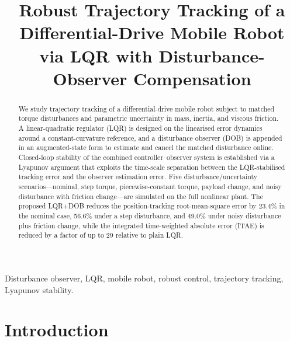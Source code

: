 \documentclass[conference]{IEEEtran}
\begin{document}
\title{Robust Trajectory Tracking of a Differential-Drive Mobile Robot via
LQR with Disturbance-Observer Compensation}

\author{%
\and
{}
\and
{}
}

\maketitle

\begin{abstract}
We study trajectory tracking of a differential-drive mobile robot subject to
matched torque disturbances and parametric uncertainty in mass, inertia, and
viscous friction. A linear-quadratic regulator (LQR) is designed on the
linearised error dynamics around a constant-curvature reference, and a
disturbance observer (DOB) is appended in an augmented-state form to estimate
and cancel the matched disturbance online. Closed-loop stability of the
combined controller--observer system is established via a Lyapunov argument
that exploits the time-scale separation between the LQR-stabilised tracking
error and the observer estimation error. Five disturbance/uncertainty
scenarios---nominal, step torque, piecewise-constant torque,
payload change, and noisy disturbance with friction change---are simulated on
the full nonlinear plant. The proposed LQR+DOB reduces the position-tracking
root-mean-square error by 23.4\% in the nominal case, 56.6\% under a step
disturbance, and 49.0\% under noisy disturbance plus friction change, while
the integrated time-weighted absolute error (ITAE) is reduced by a factor of
up to 29 relative to plain LQR.
\end{abstract}

\begin{IEEEkeywords}
Disturbance observer, LQR, mobile robot, robust control, trajectory tracking,
Lyapunov stability.
\end{IEEEkeywords}

\section{Introduction}\label{sec:intro}
\end{document}
